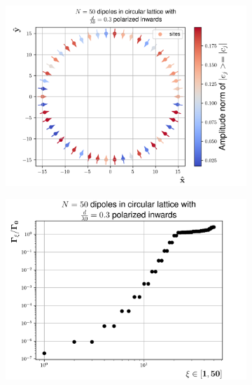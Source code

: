 \documentclass{article}
\begin{document}
\begin{figure}[H]
    \centering
    \begin{subfigure}[b]{0.49\textwidth}
        \includegraphics[width=\textwidth]{figs/dipoles_case_circular_inwards_lowest.png}
        \caption{}
        \label{fig:circular_inwards_lowest_eigenstate}
    \end{subfigure}
    \hfill
    \begin{subfigure}[b]{0.49\textwidth}
        \includegraphics[width=\textwidth]{figs/case_circular_inwards_d_03.png}
        \caption{}
        \label{fig:circular_inwards_decayrates}
    \end{subfigure}
    \caption{}
    \label{fig:circular_inwards}
\end{figure}
\end{document}
